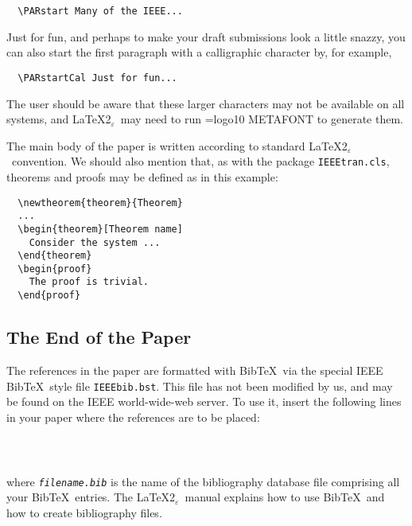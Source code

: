 \documentclass[%
	final,
	reprint,
	notitlepage,
	narroweqnarray,
	inline,
	twoside,
        invited,
	]{ieee}
\newcommand{\latexiie}{\LaTeX2{\Large$_\varepsilon$}}
\begin{document}
\unskip
\begin{verbatim}
  \PARstart Many of the IEEE...
\end{verbatim}

\PARstartCal Just for fun, and perhaps to make your draft submissions
look a little snazzy, you can also start the first paragraph with a
calligraphic character by, for example,

\unskip
\begin{verbatim}
  \PARstartCal Just for fun...
\end{verbatim}

The user should be aware that these larger characters may not be
available on all systems, and \latexiie\ may need to run
{\font\mf=logo10 \mf METAFONT} to generate them.

The main body of the paper is written according to standard \latexiie\
convention. We should also mention that, as with the package
\texttt{IEEEtran.cls}, theorems and proofs may be defined as in this
example: 
\begin{verbatim}
  \newtheorem{theorem}{Theorem}
  ...
  \begin{theorem}[Theorem name]
    Consider the system ...
  \end{theorem}
  \begin{proof}
    The proof is trivial.
  \end{proof}
\end{verbatim}

\subsection{The End of the Paper}

The references in the paper are formatted with {\sc Bib}\TeX\ via the
special IEEE {\sc Bib}\TeX\ style file \texttt{IEEEbib.bst}. This file
has not been modified by us, and may be found on the IEEE
world-wide-web server.  To use it, insert the following lines in your
paper where the references are to be placed:
\begin{verbatim}
  
  
\end{verbatim}
where \texttt{\emph{filename.bib\/}} is the name of the
bibliography data\-base file comprising all your {\sc Bib}\TeX\ entries.
The \latexiie\ manual explains how to use {\sc Bib}\TeX\ and how to
create bibliography files.
\end{document}
